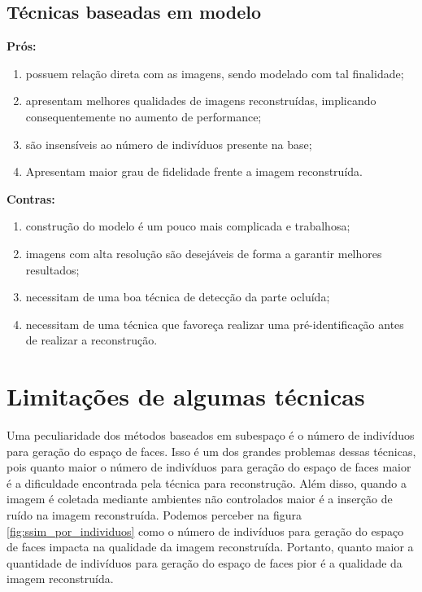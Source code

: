 \subsection{Técnicas baseadas em modelo}

\noindent \textbf{Prós:}
\begin{enumerate}
\item possuem relação direta com as imagens, sendo modelado com tal finalidade;
\item apresentam melhores qualidades de imagens reconstruídas, implicando consequentemente no aumento de performance;
\item são insensíveis ao número de indivíduos presente na base;
\item Apresentam maior grau de fidelidade frente a imagem reconstruída.
\end{enumerate}



\noindent \textbf{Contras:}
\begin{enumerate}
\item construção do modelo é um pouco mais complicada e trabalhosa;
\item imagens com alta resolução são desejáveis de forma a garantir melhores resultados;
\item necessitam de uma boa técnica de detecção da parte ocluída;
\item necessitam de uma técnica que favoreça realizar uma pré-identificação antes de realizar a reconstrução.
\end{enumerate}





\section{Limitações de algumas técnicas}

Uma peculiaridade dos métodos baseados em subespaço é o número de indivíduos para geração do espaço de faces. Isso é um dos grandes problemas dessas técnicas, pois quanto maior o número de indivíduos para geração do espaço de faces maior é a dificuldade encontrada pela técnica para reconstrução. Além disso, quando a imagem é coletada mediante ambientes não controlados maior é a inserção de ruído na imagem reconstruída. Podemos perceber na figura \ref{fig:ssim_por_individuos} como o número de indivíduos para geração do espaço de faces impacta na qualidade da imagem reconstruída. Portanto, quanto maior a quantidade de indivíduos para geração do espaço de faces pior é a qualidade da imagem reconstruída.


